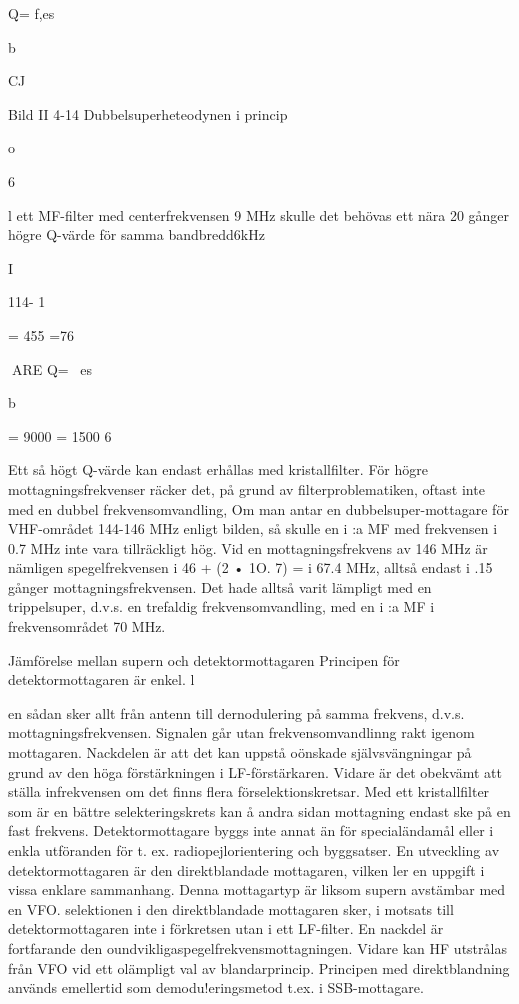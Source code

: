 \documentclass[a4paper,twoside,twocolumn,openright]{book}
\begin{document}
{{{Q= f,es

b

CJ

Bild II 4-14 Dubbelsuperheteodynen i princip

o

6

l ett MF-filter med centerfrekvensen 9
MHz skulle det behövas ett nära 20 gånger
högre Q-värde för samma bandbredd6kHz

I

114- 1

= 455 =76

ARE
Q= ~es

b

= 9000 = 1500
6

Ett så högt Q-värde kan endast erhållas
med kristallfilter.
För högre mottagningsfrekvenser räcker
det, på grund av filterproblematiken, oftast
inte med en dubbel frekvensomvandling,
Om man antar en dubbelsuper-mottagare
för VHF-området 144-146 MHz enligt bilden, så skulle en i :a MF med frekvensen
i 0.7 MHz inte vara tillräckligt hög. Vid en
mottagningsfrekvens av 146 MHz är nämligen spegelfrekvensen i 46 + (2 • 1O. 7) =
i 67.4 MHz, alltså endast i .15 gånger mottagningsfrekvensen. Det hade alltså varit
lämpligt med en trippelsuper, d.v.s. en trefaldig frekvensomvandling, med en i :a MF
i frekvensområdet 70 MHz.

Jämförelse mellan supern och detektormottagaren
Principen för detektormottagaren är enkel. l

en sådan sker allt från antenn till dernodulering på samma frekvens, d.v.s. mottagningsfrekvensen. Signalen går utan frekvensomvandlinng rakt igenom mottagaren. Nackdelen är att det kan uppstå oönskade självsvängningar på grund av den höga förstärkningen i LF-förstärkaren. Vidare är det obekvämt att ställa infrekvensen om det finns
flera förselektionskretsar. Med ett kristallfilter som är en bättre selekteringskrets kan å
andra sidan mottagning endast ske på en
fast frekvens. Detektormottagare byggs inte
annat än för specialändamål eller i enkla
utföranden för t. ex. radiopejlorientering och
byggsatser.
En utveckling av detektormottagaren är
den direktblandade mottagaren, vilken
ler en uppgift i vissa enklare sammanhang.
Denna mottagartyp är liksom supern avstämbar med en VFO.
selektionen i den direktblandade mottagaren sker, i motsats till detektormottagaren
inte i förkretsen utan i ett LF-filter. En nackdel är fortfarande den oundvikligaspegelfrekvensmottagningen. Vidare kan HF utstrålas från VFO vid ett olämpligt val av blandarprincip. Principen med direktblandning används emellertid som demodu!eringsmetod
t.ex. i SSB-mottagare.

}}}
\end{document}

